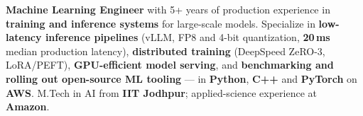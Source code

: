 \documentclass[letter,10pt]{article}
\begin{document}

\textbf{Machine Learning Engineer} with 5+ years of production experience in \textbf{training and inference systems} for large-scale models.
Specialize in \textbf{low-latency inference pipelines} (vLLM, FP8 and 4-bit quantization, \textbf{20\,ms} median production latency), \textbf{distributed training} (DeepSpeed ZeRO-3, LoRA/PEFT), \textbf{GPU-efficient model serving}, and \textbf{benchmarking and rolling out open-source ML tooling} --- in \textbf{Python}, \textbf{C++} and \textbf{PyTorch} on \textbf{AWS}.
M.Tech in AI from \textbf{IIT Jodhpur}; applied-science experience at \textbf{Amazon}.
\end{document}
